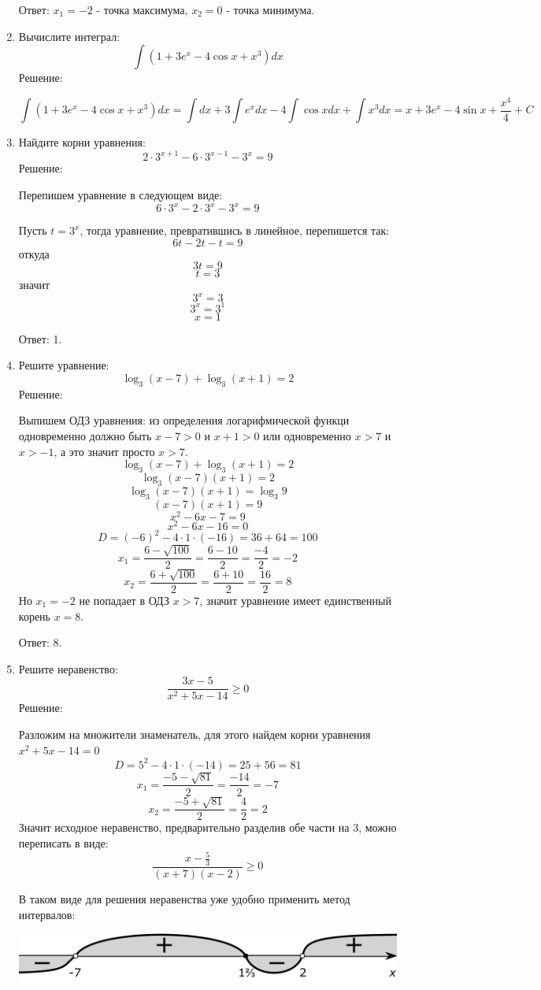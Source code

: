 \documentclass{article}
\renewcommand{\ge}{\ensuremath{\geqslant}}
\begin{document}
\begin{enumerate}
Ответ: $x_1=-2$ - точка максимума, $x_2=0$ - точка минимума.
\item %
Вычислите интеграл:
$$\int{\left(1+3e^x-4\cos{x}+x^3\right)dx}$$
Решение:

$$\int{\left(1+3e^x-4\cos{x}+x^3\right)dx}=\int{dx}+3\int{e^x dx}-4\int{\cos{x}dx}+\int{x^3dx}=x+3e^x-4\sin{x}+\frac{x^4}{4}+C$$

\item %
Найдите корни уравнения:
$$2\cdot3^{x+1}-6\cdot3^{x-1}-3^x=9$$
Решение:

Перепишем уравнение в следующем виде: $$6\cdot3^{x}-2\cdot3^{x}-3^x=9$$

Пусть $t=3^x$, тогда уравнение, превратившись в линейное, перепишется так: $$6t-2t-t=9$$ откуда $$3t=9$$ $$t=3$$ значит $$3^x=3$$ $$3^x=3^1$$ $$x=1$$

Ответ: 1.

\item %
Решите уравнение:
$$\log_3{(x-7)}+\log_3{(x+1)}=2$$
Решение:

Выпишем ОДЗ уравнения: из определения логарифмической функци одновременно должно быть $x-7>0$ и $x+1>0$ или  одновременно $x>7$ и $x>-1$, а это значит просто $x>7$.
$$\log_3{(x-7)}+\log_3{(x+1)}=2$$
$$\log_3{(x-7)(x+1)}=2$$
$$\log_3{(x-7)(x+1)}=\log_3{9}$$
$$(x-7)(x+1)=9$$
$$x^2-6x-7=9$$
$$x^2-6x-16=0$$
$$D=(-6)^2-4\cdot1\cdot(-16)=36+64=100$$
$$x_1=\frac{6-\sqrt{100}}{2}=\frac{6-10}{2}=\frac{-4}{2}=-2$$
$$x_2=\frac{6+\sqrt{100}}{2}=\frac{6+10}{2}=\frac{16}{2}=8$$
Но $x_1=-2$ не попадает в ОДЗ $x>7$, значит уравнение имеет единственный корень $x=8$.

Ответ: 8.
\item %
Решите неравенство:
$$\frac{3x-5}{x^2+5x-14}\ge0$$
Решение:

Разложим на множители знаменатель, для этого найдем корни уравнения $x^2+5x-14=0$ $$D=5^2-4\cdot1\cdot(-14)=25+56=81$$ $$x_1=\frac{-5-\sqrt{81}}{2}=\frac{-14}{2}=-7$$ $$x_2=\frac{-5+\sqrt{81}}{2}=\frac{4}{2}=2$$
Значит исходное неравенство, предварительно разделив обе части на 3, можно переписать в виде:
$$\frac{x-\frac{5}{3}}{(x+7)(x-2)}\ge0$$

В таком виде для решения неравенства уже удобно применить метод интервалов:

\includegraphics[width=\textwidth]{2_8.png}


\end{enumerate}
\end{document}
